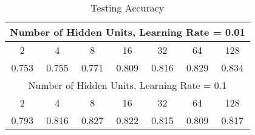 \begin{table}
\centering
\begin{tabular}{ |c|c|c|c|c|c|c|}
    \hline
    \multicolumn{7}{|c|}{Number of Hidden Units, Learning Rate = 0.01}\\ \hline
    2 & 4 & 8 & 16 & 32 & 64 & 128 \\ \hline
    0.753 & 0.755 & 0.771 & 0.809 & 0.816 & 0.829 & 0.834 \\ \hline
    \multicolumn{7}{|c|}{Number of Hidden Units, Learning Rate = 0.1}\\ \hline
    2 & 4 & 8 & 16 & 32 & 64 & 128 \\ \hline
    0.793 & 0.816 & 0.827 & 0.822 & 0.815 & 0.809 & 0.817 \\ \hline
\end{tabular}
\caption{Testing Accuracy}
\label{tab:test_accuracy}
\end{table}

